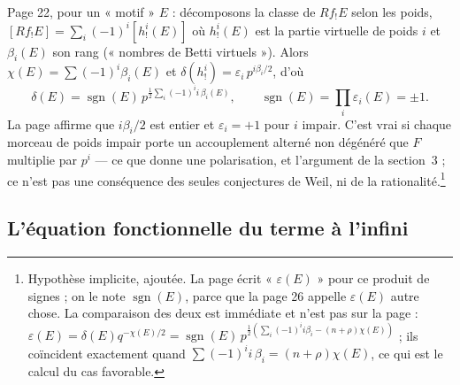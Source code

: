 \documentclass[11pt,a4paper]{article}
\begin{document}
Page 22, pour un « motif » $E$ : décomposons la classe de $Rf_{!}E$ selon les
poids, $[Rf_{!}E] = \sum_i (-1)^i [h^i_{!}(E)]$ où $h^i_{!}(E)$ est la partie
virtuelle de poids $i$ et $\beta_i(E)$ son rang (« nombres de Betti
virtuels »). Alors $\chi(E) = \sum (-1)^i\beta_i(E)$ et
$\delta(h^i_{!}) = \varepsilon_i\,p^{i\beta_i/2}$, d'où
\[
  \delta(E) = \operatorname{sgn}(E)\,p^{\frac12\sum_i (-1)^i i\,\beta_i(E)},
  \qquad \operatorname{sgn}(E) = \prod_i \varepsilon_i(E) = \pm 1 .
\]
La page affirme que $i\beta_i/2$ est entier et $\varepsilon_i = +1$ pour $i$
impair. C'est vrai si chaque morceau de poids impair porte un accouplement
alterné non dégénéré que $F$ multiplie par $p^i$ --- ce que donne une
polarisation, et l'argument de la section~3 ; ce n'est pas une conséquence
des seules conjectures de Weil, ni de la rationalité.\footnote{Hypothèse
implicite, ajoutée. La page écrit « $\varepsilon(E)$ » pour ce produit de
signes ; on le note $\operatorname{sgn}(E)$, parce que la page 26 appelle
$\varepsilon(E)$ autre chose. La comparaison des deux est immédiate et n'est
pas sur la page :
$\varepsilon(E) = \delta(E)q^{-\chi(E)/2} = \operatorname{sgn}(E)\,
p^{\frac12(\sum_i (-1)^i i\beta_i - (n+\rho)\chi(E))}$ ; ils coïncident
exactement quand $\sum (-1)^i i\,\beta_i = (n + \rho)\chi(E)$, ce qui est le
calcul du cas favorable.}

\subsection*{L'équation fonctionnelle du terme à l'infini}
\end{document}
